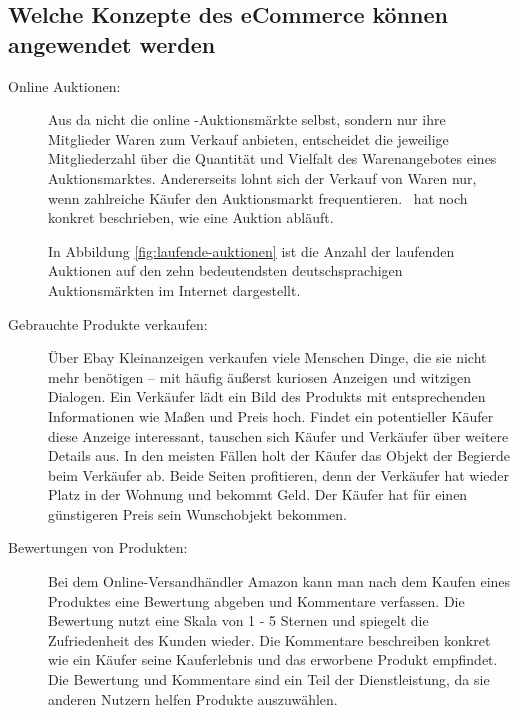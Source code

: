 \subsection{Welche Konzepte des eCommerce können angewendet werden}

\begin{description}
\item[Online Auktionen:] Aus \textcite[Kapitel 4: Wirtschaftliche Bedeutung von Ebay, S. 71]{hinneburg} \glqq da nicht die online -Auktionsmärkte selbst, sondern nur ihre Mitglieder Waren zum Verkauf anbieten, entscheidet die jeweilige Mitgliederzahl über die Quantität und Vielfalt des Warenangebotes eines Auktionsmarktes. Andererseits lohnt sich der Verkauf von Waren nur, wenn zahlreiche Käufer den Auktionsmarkt frequentieren.\grqq ~\textcite[S. 72]{hinneburg} hat noch konkret beschrieben, wie eine Auktion abläuft.

In Abbildung \vref{fig:laufende-auktionen} ist die Anzahl der laufenden Auktionen auf den zehn bedeutendsten deutschsprachigen Auktionsmärkten im Internet dargestellt.

\item[Gebrauchte Produkte verkaufen: ] Über Ebay Kleinanzeigen verkaufen viele Menschen Dinge, die sie nicht mehr benötigen – mit häufig äußerst kuriosen Anzeigen und witzigen Dialogen. Ein Verkäufer lädt ein Bild des Produkts mit entsprechenden Informationen wie Maßen und Preis hoch. Findet ein potentieller Käufer diese Anzeige interessant, tauschen sich Käufer und Verkäufer über weitere Details aus. In den meisten Fällen holt der Käufer das Objekt der Begierde beim Verkäufer ab. Beide Seiten profitieren, denn der Verkäufer hat wieder Platz in der Wohnung und bekommt Geld. Der Käufer hat für einen günstigeren Preis sein Wunschobjekt bekommen.

\item[Bewertungen von Produkten: ] Bei dem Online-Versandhändler Amazon kann man nach dem Kaufen eines Produktes eine Bewertung abgeben und Kommentare verfassen. Die Bewertung nutzt eine Skala von 1 - 5 Sternen und spiegelt die Zufriedenheit des Kunden wieder. Die Kommentare beschreiben konkret wie ein Käufer seine Kauferlebnis und das erworbene Produkt empfindet. Die Bewertung und Kommentare sind ein Teil der Dienstleistung, da sie anderen Nutzern helfen Produkte auszuwählen.
\end{description}

